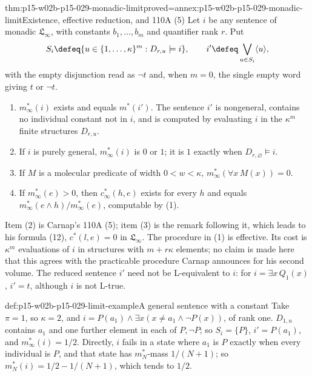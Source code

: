 \begin{hbtheorem}{thm:p15-w02b-p15-029-monadic-limit}{proved=annex:p15-w02b-p15-029-monadic-limit}{Existence, effective reduction, and 110A (5)}
Let \(i\) be any sentence of monadic \(\mathfrak L_\infty\), with
constants \(b_1,\ldots,b_m\) and quantifier rank \(r\). Put
\[
 S_i\defeq\{u\in\{1,\ldots,\kappa\}^m:D_{r,u}\models i\},\qquad
 i'\defeq\bigvee_{u\in S_i}\langle u\rangle ,
\]
with the empty disjunction read as \(\neg t\) and, when \(m=0\), the
single empty word giving \(t\) or \(\neg t\).
\begin{enumerate}
 \item \(m^*_\infty(i)\) exists and equals \(m^*(i')\). The sentence
       \(i'\) is nongeneral, contains no individual constant not in
       \(i\), and is computed by evaluating \(i\) in the
       \(\kappa^m\) finite structures \(D_{r,u}\).
 \item If \(i\) is purely general, \(m^*_\infty(i)\) is \(0\) or
       \(1\); it is \(1\) exactly when \(D_{r,\varnothing}\models i\).
 \item If \(M\) is a molecular predicate of width \(0<w<\kappa\),
       \(m^*_\infty(\forall x\,M(x))=0\).
 \item If \(m^*_\infty(e)>0\), then \(c^*_\infty(h,e)\) exists for
       every \(h\) and equals
       \(m^*_\infty(e\land h)/m^*_\infty(e)\), computable by (1).
\end{enumerate}
\end{hbtheorem}

Item (2) is Carnap's 110A (5); item (3) is the remark following it,
which leads to his formula (12), \(c^*(l,e)=0\) in
\(\mathfrak L_\infty\). The procedure in (1) is effective. Its cost
is \(\kappa^m\) evaluations of \(i\) in structures with
\(m+r\kappa\) elements; no claim is made here that this agrees with
the practicable procedure Carnap announces for his second volume. The
reduced sentence \(i'\) need not be L-equivalent to \(i\): for
\(i=\exists x\,Q_1(x)\), \(i'=t\), although \(i\) is not L-true.

\begin{hbexample}{def:p15-w02b-p15-029-limit-example}{A general sentence with a constant}
Take \(\pi=1\), so \(\kappa=2\), and
\(i=P(a_1)\land\exists x(x\ne a_1\land\neg P(x))\), of rank one.
\(D_{1,u}\) contains \(a_1\) and one further element in each of
\(P,\neg P\); so \(S_i=\{P\}\), \(i'=P(a_1)\), and
\(m^*_\infty(i)=1/2\). Directly, \(i\) fails in a state where
\(a_1\) is \(P\) exactly when every individual is \(P\), and that
state has \(m^*_N\)-mass \(1/(N+1)\); so
\(m^*_N(i)=1/2-1/(N+1)\), which tends to \(1/2\).
\end{hbexample}

